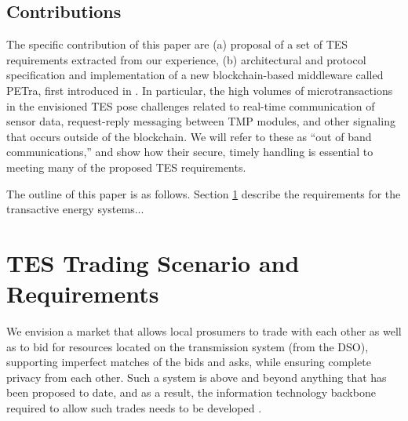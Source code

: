 \documentclass[sigplan]{acmart}
\begin{document}
\subsection{Contributions}
The specific contribution of this paper are (a) proposal of a set of TES requirements extracted from our experience, (b) architectural and protocol specification and implementation of a new blockchain-based middleware called PETra, first introduced in  \cite{Laszka17}.  In particular, the high volumes of microtransactions in the envisioned TES pose challenges related to real-time communication of sensor data, request-reply messaging between TMP modules, and other signaling that occurs outside of the blockchain. We will refer to these as ``out of band communications,'' and show how their secure, timely handling is essential to meeting many of the proposed TES requirements.  

The outline of this paper is as follows. Section \ref{sec:requirements} describe the requirements for the transactive energy systems...











\section{TES Trading Scenario and Requirements}
\label{sec:requirements}

We envision a market that allows local prosumers  to trade with each other as well as to bid for resources located on the transmission system (from the DSO), supporting imperfect matches of the bids and asks, while ensuring complete privacy from each other. Such a system is  above and beyond anything that has been proposed to date, and as a result, the information technology backbone required to allow such trades needs to be developed \cite{7747895,7725894}.
\end{document}
